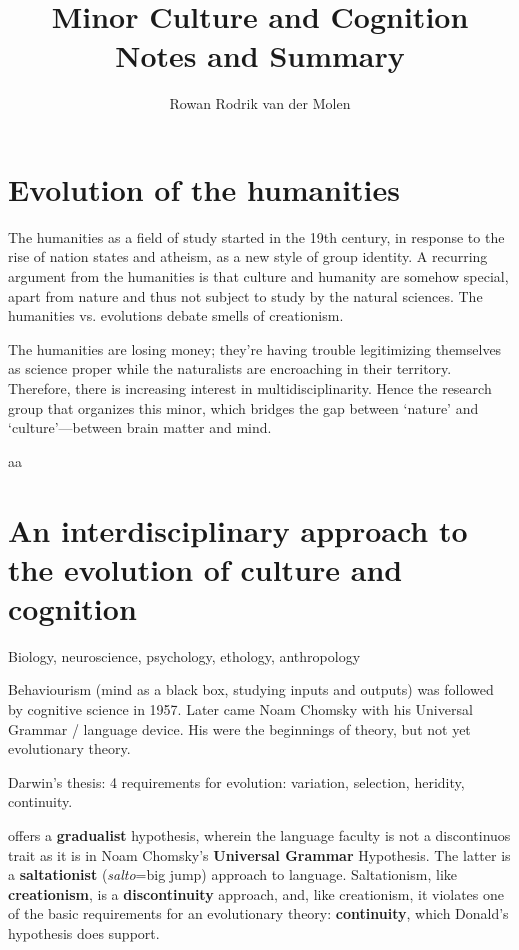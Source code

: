 \documentclass{article}
\title{Minor Culture and Cognition\\Notes and Summary}
\author{Rowan Rodrik van der Molen}
\begin{document}
\maketitle

\tableofcontents

\section{Evolution of the humanities}

The humanities as a field of study started in the 19th century, in response to the rise of nation states and atheism, as a new style of group identity.
A recurring argument from the humanities is that culture and humanity are somehow special, apart from nature and thus not subject to study by the natural sciences. The humanities vs. evolutions debate smells of creationism.

The humanities are losing money; they're having trouble legitimizing themselves as science proper while the naturalists are encroaching in their territory. Therefore, there is increasing interest in multidisciplinarity. Hence the research group that organizes this minor, which bridges the gap between ‘nature’ and ‘culture’---between brain matter and mind.



aa
\citet{mesoudi2006}


\section{An interdisciplinary approach to the evolution of culture and cognition}

Biology, neuroscience, psychology, ethology, anthropology

Behaviourism (mind as a black box, studying inputs and outputs) was followed by cognitive science in 1957. Later came Noam Chomsky with his Universal Grammar / language device. His were the beginnings of theory, but not yet evolutionary theory.

Darwin's thesis: 4 requirements for evolution: variation, selection, heridity, continuity.

\citet{donald1991} offers a \textbf{gradualist} hypothesis, wherein the language faculty is not a discontinuos trait as it is in Noam Chomsky's \textbf{Universal Grammar} Hypothesis. The latter is a \textbf{saltationist} (\textit{salto}=big jump) approach to language. Saltationism, like \textbf{creationism}, is a \textbf{discontinuity} approach, and, like creationism, it violates one of the basic requirements for an evolutionary theory: \textbf{continuity}, which Donald's hypothesis does support.
\end{document}
